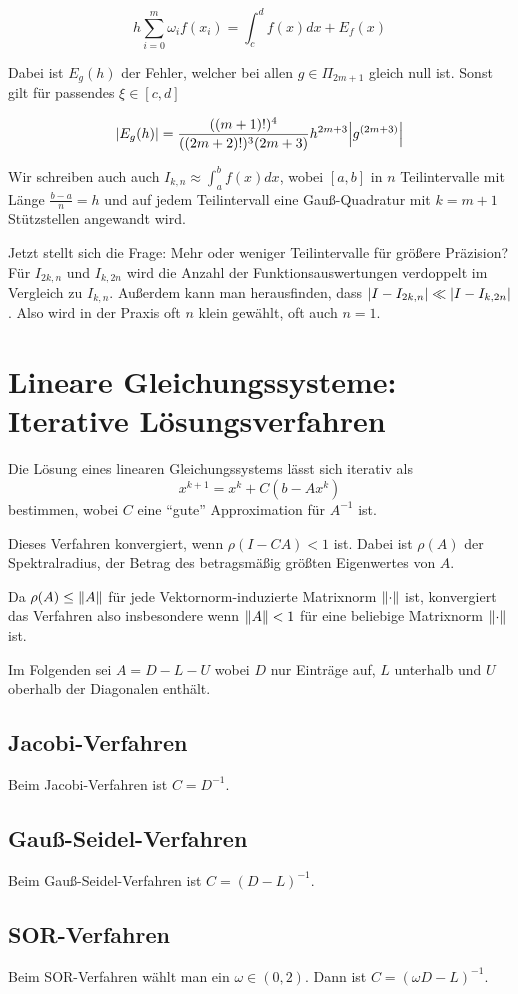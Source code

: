 \documentclass[a4paper,parskip=half*,DIV=15,fontsize=11pt]{scrartcl}
\DeclarePairedDelimiter\abs{\lvert}{\rvert}
\DeclarePairedDelimiter\norm{\lVert}{\rVert}
\begin{document}
\[
  h \sum_{i=0}^m \omega_i f(x_i) = \int_c^d f(x) dx + E_f(x)
\]

Dabei ist $E_g(h)$ der Fehler, welcher bei allen $g \in \Pi_{2m+1}$ gleich null ist. Sonst gilt für passendes $\xi \in [c, d]$

\[
  \abs*{E_g(h)} = \frac{((m+1)!)^4}{((2m+2)!)^3 (2m+3)} h^{2m+3} \abs*{g^{(2m+3)}}
\]

Wir schreiben auch auch $I_{k,n} \approx \int_a^b f(x) dx$, wobei $[a, b]$ in $n$ Teilintervalle mit Länge $\frac{b-a}{n} = h$ und auf jedem Teilintervall eine Gauß-Quadratur mit $k = m + 1$ Stützstellen angewandt wird.

Jetzt stellt sich die Frage: Mehr oder weniger Teilintervalle für größere Präzision? Für $I_{2k,n}$ und $I_{k,2n}$ wird die Anzahl der Funktionsauswertungen verdoppelt im Vergleich zu $I_{k,n}$. Außerdem kann man herausfinden, dass $\abs{I - I_{2k,n}} \ll \abs{I - I_{k,2n}}$. Also wird in der Praxis oft $n$ klein gewählt, oft auch $n = 1$.

\section{Lineare Gleichungssysteme: Iterative Lösungsverfahren}

Die Lösung eines linearen Gleichungssystems lässt sich iterativ als
\[x^{k+1} = x^k+ C(b-Ax^k)\]
bestimmen, wobei $C$ eine ``gute'' Approximation für $A^{-1}$ ist.

Dieses Verfahren konvergiert, wenn $\rho(I-CA) < 1$ ist. Dabei ist $\rho(A)$ der Spektralradius, der Betrag des betragsmäßig größten Eigenwertes von $A$.

Da $\rho(A) \le \norm{A}$ für jede Vektornorm-induzierte Matrixnorm $\norm{\cdot}$ ist, konvergiert das Verfahren also insbesondere wenn $\norm{A} < 1$ für eine beliebige Matrixnorm $\norm{\cdot}$ ist.

Im Folgenden sei $A = D-L-U$ wobei $D$ nur Einträge auf, $L$ unterhalb und $U$ oberhalb der Diagonalen enthält.

\subsection{Jacobi-Verfahren}

Beim Jacobi-Verfahren ist $C = D^{-1}$.

\subsection{Gauß-Seidel-Verfahren}

Beim Gauß-Seidel-Verfahren ist $C = (D-L)^{-1}$.

\subsection{SOR-Verfahren}

Beim SOR-Verfahren wählt man ein $\omega \in (0,2)$. Dann ist $C = (\omega D - L)^{-1}$.
\end{document}
